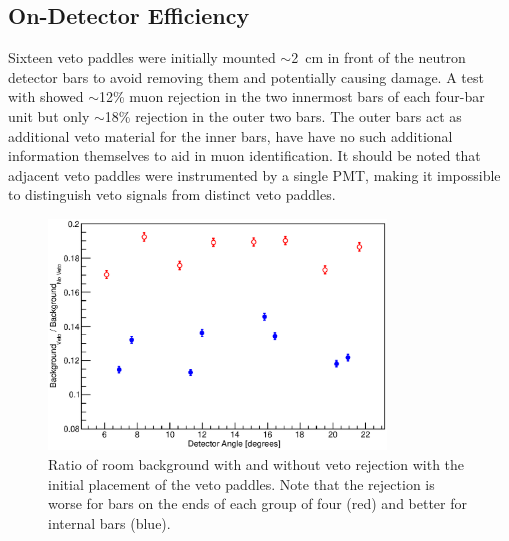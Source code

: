 \subsection{On-Detector Efficiency}

Sixteen veto paddles were initially mounted $\sim$2~cm in front of the neutron detector bars to avoid removing them and potentially causing damage.  A test with \MgReaction showed $\sim$12\% muon rejection in the two innermost bars of each four-bar unit but only $\sim$18\% rejection in the outer two bars.  The outer bars act as additional veto material for the inner bars, have have no such additional information themselves to aid in muon identification.  It should be noted that adjacent veto paddles were instrumented by a single PMT, making it impossible to distinguish veto signals from distinct veto paddles.  
\begin{figure}[!htbp]
\centering
\includegraphics[width=0.8\textwidth]{figures/bkgdRejection_old.eps}
\caption{Ratio of room background with and without veto rejection with the initial placement of the veto paddles.  Note that the rejection is worse for bars on the ends of each group of four (red) and better for internal bars (blue).}
\label{fig:initialBackground}
\end{figure}

